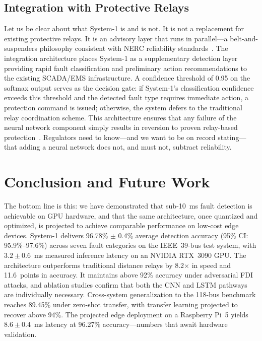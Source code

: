 \documentclass[journal]{IEEEtran}
\begin{document}
\subsection{Integration with Protective Relays}

Let us be clear about what System-1 is and is not. It is not a replacement for existing protective relays. It is an advisory layer that runs in parallel---a belt-and-suspenders philosophy consistent with NERC reliability standards~\cite{ref37}. The integration architecture places System-1 as a supplementary detection layer providing rapid fault classification and preliminary action recommendations to the existing SCADA/EMS infrastructure. A confidence threshold of 0.95 on the softmax output serves as the decision gate: if System-1's classification confidence exceeds this threshold and the detected fault type requires immediate action, a protection command is issued; otherwise, the system defers to the traditional relay coordination scheme. This architecture ensures that any failure of the neural network component simply results in reversion to proven relay-based protection~\cite{ref23}. Regulators need to know---and we want to be on record stating---that adding a neural network does not, and must not, subtract reliability.

\section{Conclusion and Future Work}
\label{sec:conclusion}

The bottom line is this: we have demonstrated that sub-10~ms fault detection is achievable on GPU hardware, and that the same architecture, once quantized and optimized, is projected to achieve comparable performance on low-cost edge devices. System-1 delivers 96.78\% $\pm$ 0.4\% average detection accuracy (95\% CI: 95.9\%--97.6\%) across seven fault categories on the IEEE~39-bus test system, with $3.2 \pm 0.6$~ms measured inference latency on an NVIDIA RTX~3090 GPU. The architecture outperforms traditional distance relays by 8.2$\times$ in speed and 11.6~points in accuracy. It maintains above 92\% accuracy under adversarial FDI attacks, and ablation studies confirm that both the CNN and LSTM pathways are individually necessary. Cross-system generalization to the 118-bus benchmark reaches 89.45\% under zero-shot transfer, with transfer learning projected to recover above 94\%. The projected edge deployment on a Raspberry Pi~5 yields $8.6 \pm 0.4$~ms latency at 96.27\% accuracy---numbers that await hardware validation.
\end{document}
